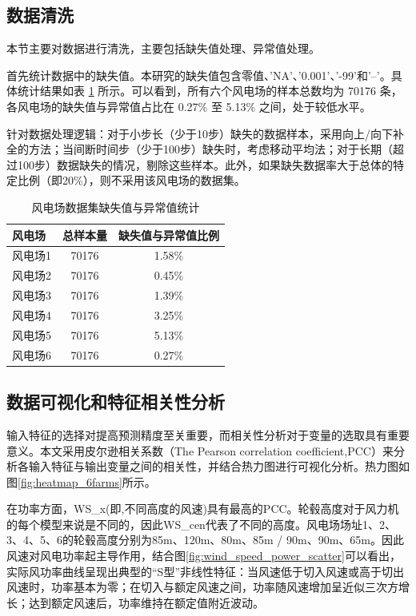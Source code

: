 \subsection{数据清洗}

本节主要对数据进行清洗，主要包括缺失值处理、异常值处理。

首先统计数据中的缺失值。本研究的缺失值包含零值、'NA'、'0.001'、'-99'和'--'。具体统计结果如表 \ref{tab:missing_values} 所示。可以看到，所有六个风电场的样本总数均为 70176 条，各风电场的缺失值与异常值占比在 0.27\% 至 5.13\% 之间，处于较低水平。

针对数据处理逻辑\cite{liu_data_2019}：对于小步长（少于10步）缺失的数据样本，采用向上/向下补全的方法；当间断时间步（少于100步）缺失时，考虑移动平均法；对于长期（超过100步）数据缺失的情况，剔除这些样本。此外，如果缺失数据率大于总体的特定比例（即20\%），则不采用该风电场的数据集。

\begin{table}[H]
    \centering
    \caption{风电场数据集缺失值与异常值统计}
    \label{tab:missing_values}
    \begin{tabular}{lcc}
        \toprule
        \textbf{风电场} & \textbf{总样本量} & \textbf{缺失值与异常值比例} \\ \midrule
        风电场1 & 70176 & 1.58\% \\
        风电场2 & 70176 & 0.45\% \\
        风电场3 & 70176 & 1.39\% \\
        风电场4 & 70176 & 3.25\% \\
        风电场5 & 70176 & 5.13\% \\
        风电场6 & 70176 & 0.27\% \\
        \bottomrule
    \end{tabular}
\end{table}



\subsection{数据可视化和特征相关性分析}
输入特征的选择对提高预测精度至关重要，而相关性分析对于变量的选取具有重要意义\cite{liu_data_2019,__2015}。本文采用皮尔逊相关系数（The Pearson correlation coefficient,PCC）来分析各输入特征与输出变量之间的相关性，并结合热力图进行可视化分析。热力图如图\ref{fig:heatmap_6farms}所示。

在功率方面，WS\_x(即,不同高度的风速)具有最高的PCC。轮毂高度对于风力机的每个模型来说是不同的，因此WS\_cen代表了不同的高度。风电场场址1、2、3、4、5、6的轮毂高度分别为85m、120m、80m、85m / 90m、90m、65m。因此风速对风电功率起主导作用，结合图\ref{fig:wind_speed_power_scatter}可以看出，实际风功率曲线呈现出典型的“S型”非线性特征：当风速低于切入风速或高于切出风速时，功率基本为零；在切入与额定风速之间，功率随风速增加呈近似三次方增长；达到额定风速后，功率维持在额定值附近波动。



